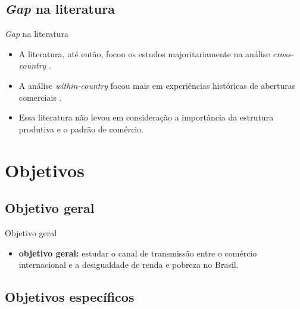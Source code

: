 \documentclass[10pt]{sintefbeamer}
\begin{document}
\subsection[]{\textit{Gap} na literatura}

\begin{frame}{\textit{Gap} na literatura}
	\begin{itemize}[<+->]
		\item A literatura, até então, focou os estudos majoritariamente na análise \textit{cross-country} \cite{borrazetal12, bayarsezgin17, campostimini22}.
		
		\item A análise \textit{within-country} focou mais em experiências históricas de aberturas comerciais \cite{galianisanguinetti03, castilho12}.
		
		\item Essa literatura não levou em consideração a importância da estrutura produtiva e o padrão de comércio.
	\end{itemize}
\end{frame}



\section{Objetivos}

\subsection[]{Objetivo geral}

\begin{frame}{Objetivo geral}
	\begin{itemize}[<+->]
		\item \textbf{objetivo geral:} estudar o canal de transmissão entre o comércio internacional e a desigualdade de renda e pobreza no Brasil.
	\end{itemize}
\end{frame}


\subsection[]{Objetivos específicos}
\end{document}
